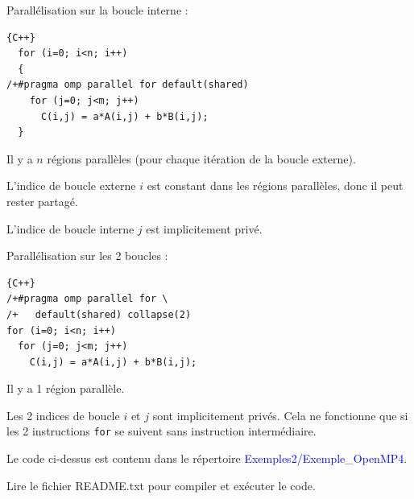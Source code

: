 \documentclass{beamer}
\begin{document}
\begin{frame}[fragile]
	Parallélisation sur la boucle interne :
	
	\begin{lstlisting}{C++}
  for (i=0; i<n; i++)
  {
/+#pragma omp parallel for default(shared)
    for (j=0; j<m; j++)
      C(i,j) = a*A(i,j) + b*B(i,j);
  }
	\end{lstlisting}
	\vfill
	Il y a $n$ régions parallèles (pour chaque itération de la boucle externe).
	
	\vfill
	L'indice de boucle externe $i$ est constant dans les régions parallèles, donc il peut rester partagé.

	\vfill
	L'indice de boucle interne $j$ est implicitement privé.
	\vfill
\end{frame}


\begin{frame}[fragile]
	Parallélisation sur les 2 boucles :
	
	\begin{lstlisting}{C++}
/+#pragma omp parallel for \
/+   default(shared) collapse(2)
for (i=0; i<n; i++)
  for (j=0; j<m; j++)
    C(i,j) = a*A(i,j) + b*B(i,j);
\end{lstlisting}
	\vfill
	Il y a 1 région parallèle.
		
	\vfill
	Les 2 indices de boucle $i$ et $j$ sont implicitement privés.
	\vfill
	Cela ne fonctionne que si les 2 instructions \verb|for| se suivent sans instruction intermédiaire.
\end{frame}

\begin{frame}
	Le code ci-dessus est contenu dans le répertoire \textcolor{blue}{Exemples2/Exemple\_OpenMP4}.
	
	Lire le fichier README.txt pour compiler et exécuter le code.
	
\end{frame}
\end{document}
